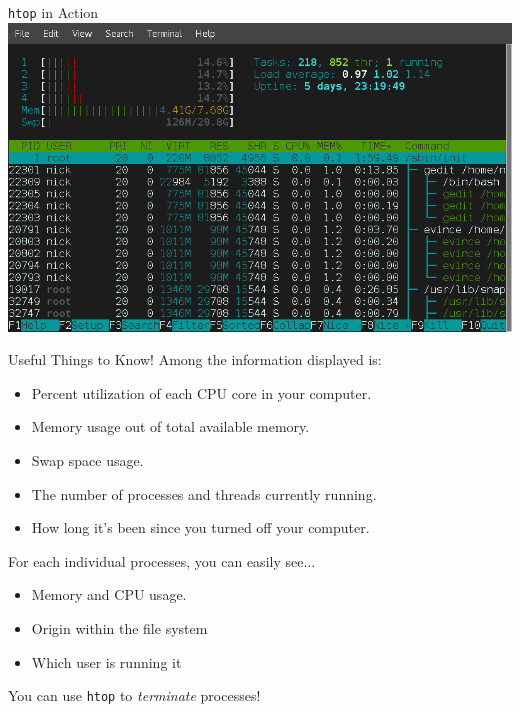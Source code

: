 \documentclass[11pt]{beamer}
\begin{document}
\begin{frame}{\texttt{htop} in Action}
\center
\includegraphics[scale=0.3]{htop2.png}
\end{frame}

\begin{frame}{Useful Things to Know!}
Among the information displayed is:
\begin{itemize}
\item Percent utilization of each CPU core in your computer.
\item Memory usage out of total available memory.
\item Swap space usage.
\item The number of processes and threads currently running.
\item How long it's been since you turned off your computer.  
\end{itemize}
For each individual processes, you can easily see...
\begin{itemize}
\item Memory and CPU usage. 
\item Origin within the file system
\item Which user is running it
\end{itemize}
You can use \texttt{htop} to \emph{terminate} processes!
\end{frame}
\end{document}
